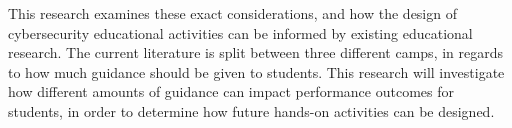 This research examines these exact considerations, and how the design of cybersecurity educational activities can be informed by existing educational research. The current literature is split between three different camps, in regards to how much guidance should be given to students. This research will investigate how different amounts of guidance can impact performance outcomes for students, in order to determine how future hands-on activities can be designed. 
    